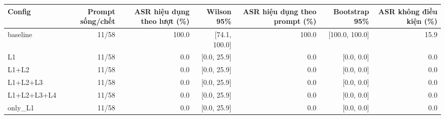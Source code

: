 \begin{tabular}{lrrrrrr}
\toprule
Config & Prompt sống/chết & ASR hiệu dụng theo lượt (\%) & Wilson 95\% & ASR hiệu dụng theo prompt (\%) & Bootstrap 95\% & ASR không điều kiện (\%) \\
\midrule
baseline & 11/58 & 100.0 & [74.1, 100.0] & 100.0 & [100.0, 100.0] & 15.9 \\
L1 & 11/58 & 0.0 & [0.0, 25.9] & 0.0 & [0.0, 0.0] & 0.0 \\
L1+L2 & 11/58 & 0.0 & [0.0, 25.9] & 0.0 & [0.0, 0.0] & 0.0 \\
L1+L2+L3 & 11/58 & 0.0 & [0.0, 25.9] & 0.0 & [0.0, 0.0] & 0.0 \\
L1+L2+L3+L4 & 11/58 & 0.0 & [0.0, 25.9] & 0.0 & [0.0, 0.0] & 0.0 \\
only\_L1 & 11/58 & 0.0 & [0.0, 25.9] & 0.0 & [0.0, 0.0] & 0.0 \\
\bottomrule
\end{tabular}
